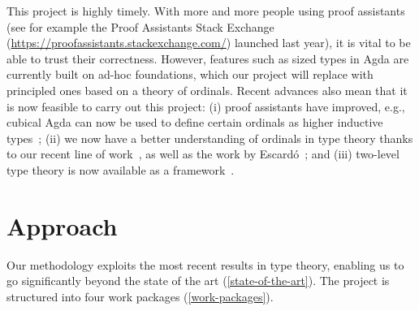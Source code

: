 \documentclass[a4paper,11pt]{article}
\let\oldcite\cite
\renewcommand*\cite[1]{{\protect\NoHyper\oldcite{#1}\protect\endNoHyper}}
\begin{document}
This project is highly timely. With more and more people using proof assistants (see for example the {Proof Assistants Stack Exchange} (\url{https://proofassistants.stackexchange.com/}) launched last year), it is vital to be able to trust their correctness. However, features such as sized types in Agda are currently built on ad-hoc foundations, which our project will replace with principled ones based on a theory of ordinals.
%
Recent advances also mean that it is now feasible to carry out this project: (i) proof assistants have improved, e.g., cubical Agda can now be used to define certain ordinals as higher inductive types~\cite{ordTCS}; (ii) we now have a better understanding of ordinals in type theory thanks to our recent line of work~\cite{NordvallForsbergXu2020ord,KrausNordvallForsbergXu2021ordHoTT,ordTCS,dejong-kra-nf-xu:set-type-ordinals},
as well as the work by Escard\'o~\cite{TypeTopologyOrdinals}; and (iii) two-level type theory is now available as a framework~\cite{annenkov_capriotti_kraus_sattler_2023}.

\section{Approach} %

Our methodology exploits the most recent results in type theory, enabling us to go significantly beyond the state of the art (\cref{state-of-the-art}). The project is structured into four work packages (\cref{work-packages}).
\end{document}
